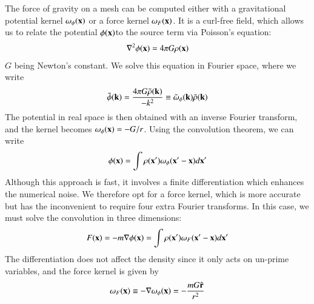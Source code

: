 The force of gravity on a mesh can be computed either with a gravitational potential  kernel $\omega_{\phi} ({\bf x})$
  or a force  kernel $\omega_{F} ({\bf x})$.
It is a curl-free field, which allows us to relate the potential $\phi({\bf x})$to the source term via Poisson's equation: 
\begin{eqnarray}
\nabla^{2}\phi({\bf x}) = 4 \pi G \rho({\bf x})
\label{eq:poisson}
\end{eqnarray}
$G$ being Newton's constant. We solve this equation in Fourier space, where we write
\begin{eqnarray}
 \tilde{\phi}({\bf k}) = \frac{4 \pi G \tilde{\rho}({\bf k})}{- k^{2}} \equiv \tilde{\omega}_{\phi}({\bf k})\tilde{\rho}({\bf k})
\label{eq:poissonFourier}
\end{eqnarray}
The potential in real space is then obtained with an inverse Fourier transform, and the kernel becomes $\omega_{\phi} ({\bf x}) = -G/r$.
Using the convolution theorem, we can write
\begin{eqnarray}
 \phi({\bf x}) = \int \rho({\bf x'}) \omega_{\phi}({\bf x'} - {\bf x}) d{\bf x'}
\label{eq:poisson_solution_pot}
\end{eqnarray}
Although this approach is fast, it involves a finite differentiation which enhances the numerical noise.
We therefore opt for a force kernel, which is more accurate but has the inconvenient to require four extra Fourier transforms.
In this case, we must solve the convolution in three dimensions:
\begin{eqnarray}
 F({\bf x}) = - m {\bf \nabla} \phi({\bf x})   = \int \rho({\bf x'}) {\bf  \omega}_{F}({\bf x'} - {\bf x}) d{\bf x'}                                      
\label{eq:poisson_solution_force}
\end{eqnarray}
The differentiation does not affect the density since it only acts on un-prime variables,
and the force kernel is given by 
\begin{eqnarray}
{\bf  \omega}_{F}({\bf x}) \equiv - {\bf \nabla}\omega_{\phi}({\bf x}) = - \frac{mG \hat{\bf r}}{r^{2}}
\end{eqnarray}

